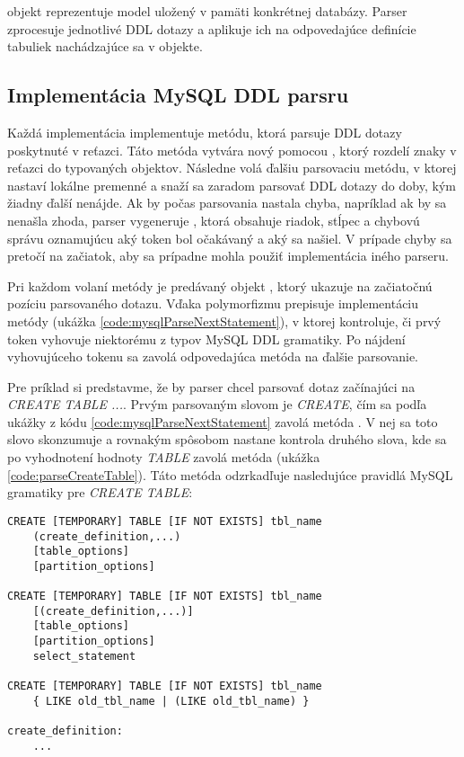  objekt reprezentuje model uložený v pamäti konkrétnej databázy. Parser zprocesuje jednotlivé DDL dotazy a aplikuje ich na odpovedajúce definície tabuliek nachádzajúce sa v  objekte.

\subsection{Implementácia MySQL DDL parsru}
Každá implementácia  implementuje metódu, ktorá parsuje DDL dotazy poskytnuté v reťazci. Táto metóda vytvára nový  pomocou , ktorý rozdelí znaky v reťazci do typovaných  objektov. Následne volá ďalšiu parsovaciu metódu, v ktorej nastaví lokálne premenné a snaží sa zaradom parsovať DDL dotazy do doby, kým žiadny ďalší nenájde. Ak by počas parsovania nastala chyba, napríklad ak by sa nenašla zhoda, parser vygeneruje , ktorá obsahuje riadok, stĺpec a chybovú správu oznamujúcu aký token bol očakávaný a aký sa našiel. V prípade chyby sa  pretočí na začiatok, aby sa prípadne mohla použiť implementácia iného parseru.

Pri každom volaní metódy  je predávaný objekt , ktorý ukazuje na začiatočnú pozíciu parsovaného dotazu. Vďaka polymorfizmu  prepisuje implementáciu  metódy (ukážka \ref{code:mysqlParseNextStatement}), v ktorej kontroluje, či prvý token vyhovuje niektorému z typov MySQL DDL gramatiky. Po nájdení vyhovujúceho tokenu sa zavolá odpovedajúca metóda na ďalšie parsovanie. 

Pre príklad si predstavme, že by parser chcel parsovať dotaz začínajúci na \textit{CREATE TABLE ...}. Prvým parsovaným slovom je \textit{CREATE}, čím sa podľa ukážky z kódu \ref{code:mysqlParseNextStatement} zavolá metóda . V nej sa toto slovo skonzumuje a rovnakým spôsobom nastane kontrola druhého slova, kde sa po vyhodnotení hodnoty \textit{TABLE} zavolá metóda  (ukážka \ref{code:parseCreateTable}). Táto metóda odzrkadľuje nasledujúce pravidlá MySQL gramatiky pre \textit{\mbox{CREATE} TABLE}:
\newline
\begin{lstlisting}[language=MySQL, frame=none, numbers=none]
CREATE [TEMPORARY] TABLE [IF NOT EXISTS] tbl_name
    (create_definition,...)
    [table_options]
    [partition_options]

CREATE [TEMPORARY] TABLE [IF NOT EXISTS] tbl_name
    [(create_definition,...)]
    [table_options]
    [partition_options]
    select_statement

CREATE [TEMPORARY] TABLE [IF NOT EXISTS] tbl_name
    { LIKE old_tbl_name | (LIKE old_tbl_name) }

create_definition:
    ...
\end{lstlisting}


